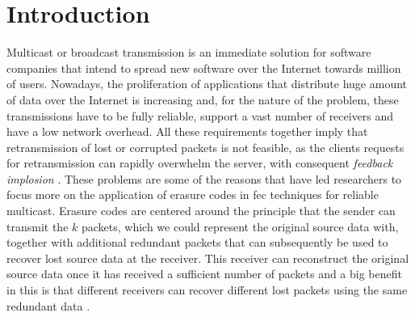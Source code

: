 \section{Introduction}
\label{sec:intro}
Multicast or broadcast transmission is an immediate solution for software companies that intend to spread new software over the Internet  towards million of users. Nowadays, the proliferation of applications that distribute huge amount of data over the Internet is increasing and, for the nature of the problem, these transmissions have to be fully reliable, support a vast number of receivers and have a low network overhead. All these requirements together imply that retransmission of lost or corrupted packets is not feasible, as the clients requests for retransmission can rapidly overwhelm the server, with consequent \textit{feedback implosion}  \cite{Byers}. These problems are some of the reasons that have led researchers to focus more on the application of erasure codes in \gls{fec} techniques for reliable multicast. Erasure codes are centered around the principle that the sender can transmit the $k$ packets, which we could represent the original source data with, together with additional redundant packets that can subsequently be used to recover lost source data at the receiver. This receiver can reconstruct the original source data once it has received a sufficient number of packets and a big benefit in this is that different receivers can recover different lost packets using the same redundant data \cite{Byers}.
